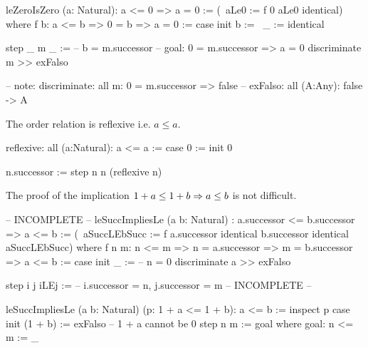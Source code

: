 \begin{alba}
    leZeroIsZero (a: Natural): a <= 0 => a = 0
    :=
        (\ aLe0 := f 0 aLe0 identical)
        where
            f b: a <= b => 0 = b => a = 0
            :=
                case
                    init b :=
                        \ _ := identical

                    step _ m _ :=
                        -- b = m.successor
                        -- goal: 0 = m.successor => a = 0
                        discriminate m >> exFalso

    -- note: discriminate: all m: 0 = m.successor => false
    --       exFalso:      all (A:Any): false -> A
\end{alba}





\noindent The order relation is reflexive i.e. $a \le a$.

\begin{alba}
    reflexive: all (a:Natural): a <= a :=
        case
            0 :=
                init 0

            n.successor :=
                step n n (reflexive n)
\end{alba}




\noindent The proof of the implication $ 1 + a \le 1 + b \Rightarrow a \le b$ is not
difficult.


\begin{alba}
    -- INCOMPLETE --
    leSuccImpliesLe
        (a b: Natural)
        : a.successor <= b.successor =>  a <= b
    :=
        (\ aSuccLEbSucc :=
            f a.successor identical b.successor identical aSuccLEbSucc)
        where
            f n m: n <= m => n = a.successor => m = b.successor => a <= b
            :=
                case
                    init _ :=
                        -- n = 0
                        discriminate a >> exFalso

                    step i j iLEj :=
                        -- i.successor = n, j.successor = m
                        -- INCOMPLETE --
\end{alba}


\begin{alba}
  leSuccImpliesLe (a b: Natural) (p: 1 + a <= 1 + b): a <= b :=
    inspect p case
      init (1 + b) :=
        exFalso      -- 1 + a cannot be 0
      step n m :=
        goal where
          goal: n <= m := _
\end{alba}


